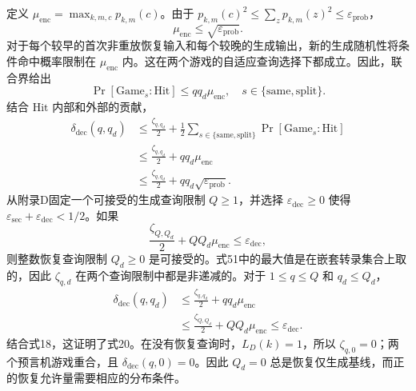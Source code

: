 定义 \(\mu_{\mathrm{enc}} = \max_{k,m,c} p_{k,m}(c)\)。由于 \(p_{k,m}(c)^2 \le \sum_z p_{k,m}(z)^2 \le \varepsilon_{\mathrm{prob}}\)，
\begin{equation}
\mu_{\mathrm{enc}} \le \sqrt{\varepsilon_{\mathrm{prob}}}. \tag{52}
\end{equation}
对于每个较早的首次非重放恢复输入和每个较晚的生成输出，新的生成随机性将条件命中概率限制在 \(\mu_{\mathrm{enc}}\) 内。这在两个游戏的自适应查询选择下都成立。因此，联合界给出
\begin{equation}
\Pr[\mathrm{Game}_s : \mathrm{Hit}] \le q q_d \mu_{\mathrm{enc}}, \quad s \in \{\mathrm{same}, \mathrm{split}\}. \tag{53}
\end{equation}
结合 \(\mathrm{Hit}\) 内部和外部的贡献，
\begin{equation}
\begin{aligned}
\delta_{\mathrm{dec}}(q, q_d) &\le \frac{\zeta_{q, q_d}}{2} + \frac{1}{2} \sum_{s \in \{\mathrm{same}, \mathrm{split}\}} \Pr[\mathrm{Game}_s : \mathrm{Hit}] \\
&\le \frac{\zeta_{q, q_d}}{2} + q q_d \mu_{\mathrm{enc}} \\
&\le \frac{\zeta_{q, q_d}}{2} + q q_d \sqrt{\varepsilon_{\mathrm{prob}}}.
\end{aligned} \tag{54}
\end{equation}
从附录D固定一个可接受的生成查询限制 \(Q \ge 1\)，并选择 \(\varepsilon_{\mathrm{dec}} \ge 0\) 使得 \(\varepsilon_{\mathrm{sec}} + \varepsilon_{\mathrm{dec}} < 1/2\)。如果
\begin{equation}
\frac{\zeta_{Q, Q_d}}{2} + Q Q_d \mu_{\mathrm{enc}} \le \varepsilon_{\mathrm{dec}}, \tag{55}
\end{equation}
则整数恢复查询限制 \(Q_d \ge 0\) 是可接受的。式51中的最大值是在嵌套转录集合上取的，因此 \(\zeta_{q,d}\) 在两个查询限制中都是非递减的。对于 \(1 \le q \le Q\) 和 \(q_d \le Q_d\)，
\begin{equation}
\begin{aligned}
\delta_{\mathrm{dec}}(q, q_d) &\le \frac{\zeta_{q, q_d}}{2} + q q_d \mu_{\mathrm{enc}} \\
&\le \frac{\zeta_{Q, Q_d}}{2} + Q Q_d \mu_{\mathrm{enc}} \le \varepsilon_{\mathrm{dec}}.
\end{aligned} \tag{56}
\end{equation}
结合式18，这证明了式20。在没有恢复查询时，\(L_D(k) = 1\)，所以 \(\zeta_{q,0} = 0\)；两个预言机游戏重合，且 \(\delta_{\mathrm{dec}}(q, 0) = 0\)。因此 \(Q_d = 0\) 总是恢复仅生成基线，而正的恢复允许量需要相应的分布条件。

